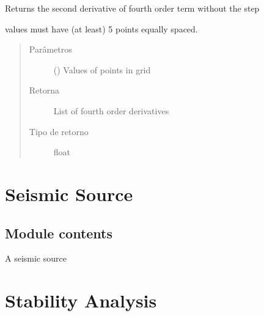 \documentclass[letterpaper,10pt,brazil]{sphinxmanual}
\begin{document}

\begin{fulllineitems}
\label{\detokenize{source/wave:wave.fpp_fourth_order_term}}
Returns the second derivative of fourth order term without the step

values must have (at least) 5 points equally spaced.
\begin{quote}\begin{description}
\item[{Parâmetros}] \leavevmode
{} () \textendash{} Values of points in grid

\item[{Retorna}] \leavevmode
List of fourth order derivatives

\item[{Tipo de retorno}] \leavevmode
float

\end{description}\end{quote}

\end{fulllineitems}



\section{Seismic Source}
\label{\detokenize{source/source::doc}}\label{\detokenize{source/source:seismic-source}}

\subsection{Module contents}
\label{\detokenize{source/source:module-source}}\label{\detokenize{source/source:module-contents}}

\begin{fulllineitems}
\label{\detokenize{source/source:source.source}}
A seismic source

\end{fulllineitems}



\section{Stability Analysis}
\label{\detokenize{source/stability::doc}}\label{\detokenize{source/stability:stability-analysis}}
\end{document}
